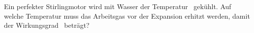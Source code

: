 Ein perfekter Stirlingmotor wird mit Wasser der Temperatur \tkO\ gekühlt. Auf welche Temperatur muss das Arbeitsgas vor der Expansion erhitzt werden, damit der Wirkungsgrad \etSO\ beträgt?
